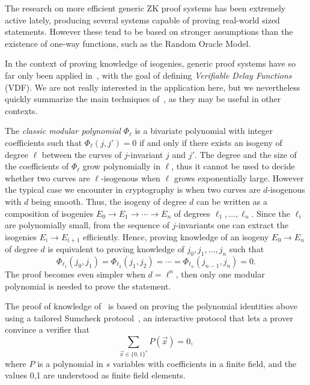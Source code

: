 \documentclass{llncs}
\begin{document}
The research on more efficient generic ZK proof systems has been extremely active lately, producing several systems capable of proving real-world sized statements.
However these tend to be based on stronger assumptions than the existence of one-way functions, such as the Random Oracle Model. %

In the context of proving knowledge of isogenies, generic proof systems have so far only been applied in~\cite{10.1007/978-3-030-99277-4_21}, with the goal of defining \emph{Verifiable Delay Functions} (VDF).
We are not really interested in the application here, but we nevertheless quickly summarize the main techniques of~\cite{10.1007/978-3-030-99277-4_21}, as they may be useful in other contexts.

The \emph{classic modular polynomial} $\Phi_\ell$ is a bivariate polynomial with integer coefficients such that $\Phi_\ell(j, j') = 0$ if and only if there exists an isogeny of degree $\ell$ between the curves of $j$-invariant $j$ and $j'$.
The degree and the size of the coefficients of $\Phi_\ell$ grow polynomially in $\ell$, thus it cannot be used to decide whether two curves are $\ell$-isogenous when $\ell$ grows exponentially large.
However the typical case we encounter in cryptography is when two curves are $d$-isogenous with $d$ being smooth.
Thus, the isogeny of degree $d$ can be written as a composition of isogenies $E_0 \to E_1 \to \cdots \to E_n$ of degrees $\ell_1, \ldots, \ell_n$.
Since the $\ell_i$ are polynomially small, from the sequence of $j$-invariants one can extract the isogenies $E_i \to E_{i+1}$ efficiently. Hence, proving knowledge of an isogeny $E_0 \to E_n$ of degree $d$ is equivalent to proving knowledge of $j_0, j_1, \ldots, j_n$ such that
\begin{equation}
    \label{eq:modpol}
    \Phi_{\ell_1}(j_0, j_1) = \Phi_{\ell_2}(j_1, j_2) = \cdots = \Phi_{\ell_n}(j_{n-1},j_n) = 0.
\end{equation}
The proof becomes even simpler when $d = \ell^n$, then only one modular polynomial is needed to prove the statement.

The proof of knowledge of~\cite{10.1007/978-3-030-99277-4_21} is based on proving the  polynomial identities above using a tailored Sumcheck protocol~\cite{10.1145/146585.146605}, an interactive protocol that lets a prover convince a verifier that
\begin{equation}
    \sum_{\vec{x}\in\{0,1\}^s} P(\vec{x}) = 0,
\end{equation}
where $P$ is a polynomial in $s$ variables with coefficients in a finite field, and the values 0,1 are understood as finite field elements.
\end{document}
